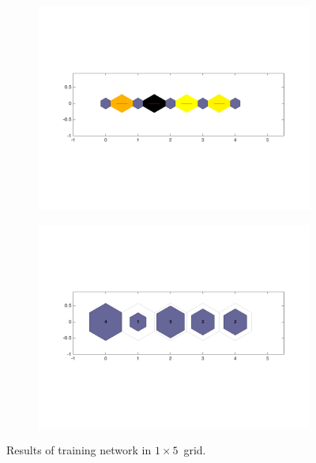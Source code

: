     \begin{figure}
        \begin{subfigure}[b]{0.5\textwidth}
            \centering
            \includegraphics[width=\textwidth]{../images/1d/apps/dist_1_by_5.png}
        \end{subfigure}
        \hfill
        \begin{subfigure}[b]{0.5\textwidth}
             \includegraphics[width=\textwidth]{../images/1d/apps/hit_t_1_by_5.png}
        \end{subfigure}
                \caption{Results of training network in $1\times5$~grid.}
         \label{fig: 1by5T}
    \end{figure}
    
